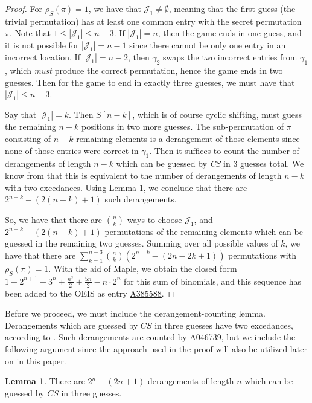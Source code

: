 \documentclass[article]{amsart}
\theoremstyle{definition}
\newtheorem{lemma}[theorem]{Lemma}
\theoremstyle{definition}
\theoremstyle{remark}
\newcommand{\oeis}[1]{\href{https://oeis.org/#1}{\rm  \underline{#1}}}
\begin{document}
\begin{proof}
For $\rho_S(\pi) = 1$, we have that $\mathcal{J}_1 \neq \emptyset$, meaning that the first guess (the trivial permutation) has at least one common entry with the secret permutation $\pi$. Note that $1 \leq |\mathcal{J}_1| \leq n-3$. If $|\mathcal{J}_1| = n$, then the game ends in one guess, and it is not possible for $|\mathcal{J}_1| = n-1$ since there cannot be only one entry in an incorrect location. If $|\mathcal{J}_1| = n-2$, then $\gamma_2$ swaps the two incorrect entries from $\gamma_1$, which \textit{must} produce the correct permutation, hence the game ends in two guesses. Then for the game to end in exactly three guesses, we must have that $|\mathcal{J}_1| \leq n-3$.

Say that $|\mathcal{J}_1| = k$. Then $S[n-k]$, which is of course cyclic shifting, must guess the remaining $n-k$ positions in two more guesses. The sub-permutation of $\pi$ consisting of $n-k$ remaining elements is a derangement of those elements since none of those entries were correct in $\gamma_1$. Then it suffices to count the number of derangements of length $n-k$ which can be guessed by \textit{CS} in 3 guesses total. We know from \cite{kutin2024permutationwordle} that this is equivalent to the number of derangements of length $n-k$ with two excedances. Using Lemma \ref{lem:der2ex}, we conclude that there are $2^{n-k} - (2(n-k) + 1)$ such derangements.

So, we have that there are $\binom{n}{k}$ ways to choose $\mathcal{J}_1$, and $2^{n-k} - (2(n-k) + 1)$ permutations of the remaining elements which can be guessed in the remaining two guesses. Summing over all possible values of $k$, we have that there are $\sum_{k=1}^{n-3} \binom{n}{k} \left(2^{n-k} - (2n - 2k + 1) \right)$ permutations with $\rho_S(\pi) = 1$. With the aid of Maple, we obtain the closed form $1 - 2^{n + 1} + 3^n + \frac{n^2}{2} + \frac{5n}{2} - n\cdot 2^n$ for this sum of binomials, and this sequence has been added to the OEIS as entry \oeis{A385588}.
\end{proof}

Before we proceed, we must include the derangement-counting lemma. Derangements which are guessed by $CS$ in three guesses have two excedances, according to \cite{kutin2024permutationwordle}. Such derangements are counted by \oeis{A046739}, but we include the following argument since the approach used in the proof will also be utilized later on in this paper.

\begin{lemma} \label{lem:der2ex}
    There are $2^n - (2n+1)$ derangements of length $n$ which can be guessed by $CS$ in three guesses.
\end{lemma}
\end{document}
